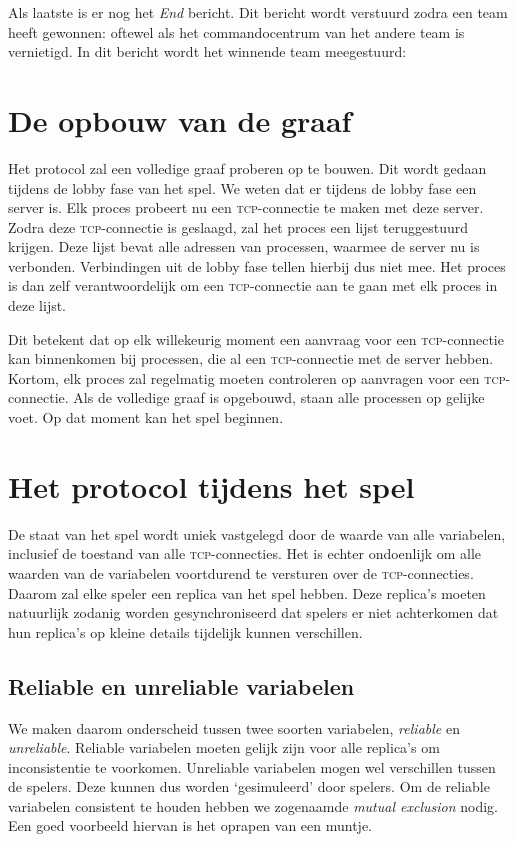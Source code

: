 \documentclass[a4paper,11pt]{article}
\newcommand{\bericht}[1]{
{\begin{center}

\colorbox{YellowGreen!20}{\makebox[\textwidth][c]{{
\textsc{#1}
}}}
\end{center}
}}
\newcommand{\tcp}{\textsc{tcp}\xspace}
\begin{document}
Als laatste is er nog het \emph{End} bericht. Dit bericht wordt verstuurd zodra een team heeft gewonnen: oftewel als het commandocentrum van het andere team is vernietigd. In dit bericht wordt het winnende team meegestuurd:
\bericht{R END, tid.}

    \section{De opbouw van de graaf}
    Het protocol zal een volledige graaf proberen op te bouwen. Dit wordt gedaan tijdens de lobby fase van het spel. We weten dat er tijdens de lobby fase een server is. Elk proces probeert nu een \tcp-connectie te maken met deze server. Zodra deze \tcp-connectie is geslaagd, zal het proces een lijst teruggestuurd krijgen. Deze lijst bevat alle adressen van processen, waarmee de server nu is verbonden. Verbindingen uit de lobby fase tellen hierbij dus niet mee. Het proces is dan zelf verantwoordelijk om een \tcp-connectie aan te gaan met elk proces in deze lijst.

    Dit betekent dat op elk willekeurig moment een aanvraag voor een \tcp-connectie kan binnenkomen bij processen, die al een \tcp-connectie met de server hebben. Kortom, elk proces zal regelmatig moeten controleren op aanvragen voor een \tcp-connectie. Als de volledige graaf is opgebouwd, staan alle processen op gelijke voet. Op dat moment kan het spel beginnen.

    \section{Het protocol tijdens het spel}
    \label{sec:tijdensspel}
    De staat van het spel wordt uniek vastgelegd door de waarde van alle variabelen, inclusief de toestand van alle \tcp-connecties. Het is echter ondoenlijk om alle waarden van de variabelen voortdurend te versturen over de \tcp-connecties. Daarom zal elke speler een replica van het spel hebben. Deze replica's moeten natuurlijk zodanig worden gesynchroniseerd dat spelers er niet achterkomen dat hun replica's op kleine details tijdelijk kunnen verschillen.

    \subsection{Reliable en unreliable variabelen}
    We maken daarom onderscheid tussen twee soorten variabelen, \emph{reliable} en \emph{unreliable}. Reliable variabelen moeten gelijk zijn voor alle replica's om inconsistentie te voorkomen. Unreliable variabelen mogen wel verschillen tussen de spelers. Deze kunnen dus worden `gesimuleerd' door spelers. Om de reliable variabelen consistent te houden hebben we zogenaamde \emph{mutual exclusion} nodig. Een goed voorbeeld hiervan is het oprapen van een muntje.
\end{document}
